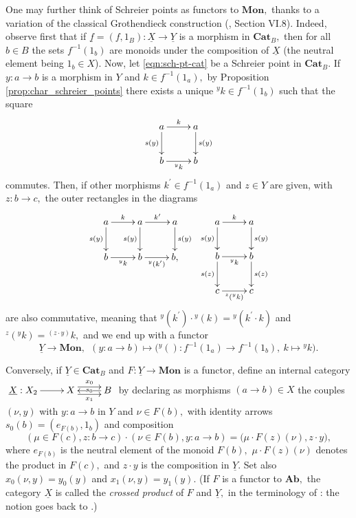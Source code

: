 \documentclass[11pt]{amsart}
\theoremstyle{plain}
\theoremstyle{definition}
\theoremstyle{remark}
\newcommand{\un}{\underline}
\begin{document}
One may further think of Schreier points as functors to $\mathbf{Mon},$ thanks to a variation of the classical Grothendieck construction (\cite{sga1}, Section VI.8). Indeed, observe first that if $\un{f}=(f,1_B)\colon\un{X}\rightarrow\un{Y}$ is a morphism in $\mathbf{Cat}_B,$ then for all $b\in B$ the sets $f^{-1}(1_b)$ are monoids under the composition of $\un{X}$ (the neutral element being $1_b\in X$). Now, let \eqref{eqn:sch-pt-cat} be a Schreier point in $\mathbf{Cat}_B.$ If $y\colon a\rightarrow b$ is a morphism in $Y$ and $k\in f^{-1}(1_a),$ by Proposition \ref{prop:char_schreier_points} there exists a unique $^yk\in f^{-1}(1_b)$ such that the square
\begin{equation*}
\xymatrix{
a \ar[d]_-{s(y)} \ar[r]^-k &a \ar[d]^-{s(y)} \\
b \ar[r]_-{^yk} &b
}
\end{equation*}
commutes. Then, if other morphisms $k^\prime\in f^{-1}(1_a)$ and $z\in Y$ are given, with $z\colon b\rightarrow c,$ the outer rectangles in the diagrams
\begin{equation*}
\begin{aligned}
\xymatrix{
a \ar[d]_-{s(y)} \ar[r]^-k &a \ar[d]_-{s(y)} \ar[r]^-{k^\prime} &a \ar[d]^-{s(y)} \\
b \ar[r]_-{^yk} &b \ar[r]_-{^y(k^\prime)} &{b,}
}
\
\xymatrix{
a \ar[d]_-{s(y)} \ar[r]^-k &a \ar[d]^-{s(y)} \\
b \ar[r]_-{^yk}  \ar[d]_-{s(z)} &b \ar[d]^-{s(z)} \\
c \ar[r]_-{^z(^yk)} &c
}
\end{aligned}
\end{equation*}
are also commutative, meaning that ${^y(k^\prime)}\cdot{}^y(k)={^y(k^\prime\cdot k)}$ and $^z(^yk)={^{(z\cdot y)}k},$ and we end up with a functor
\begin{equation}
\label{eqn:functor_sch_point}
\underline{Y} \rightarrow \mathbf{Mon}, \ \  (y\colon a\rightarrow b) \mapsto \big({^y()}\colon f^{-1}(1_a)\rightarrow f^{-1}(1_b), \ k\mapsto {^yk}\big).
\end{equation}

Conversely, if $\underline{Y}\in\mathbf{Cat}_B$ and $F\colon\underline{Y}\longrightarrow \mathbf{Mon}$ is a functor, define an internal category $\xymatrix{{\underline{X}:X_2} \ar[r] &{X} \ar@<.9ex>[r]^-{x_0} \ar@<-.9ex>[r]_-{x_1} &{B} \ar[l]|-{s_0}}$ by declaring as morphisms $(a\rightarrow b)\in X$ the couples $(\nu, y)$ with $y\colon a\rightarrow b$ in $Y$ and $\nu\in F(b),$ with identity arrows $s_0(b)=(e_{F(b)},1_b)$ and composition
\[
(\mu\in F(c),z\colon b\rightarrow c)\cdot(\nu\in F(b),y\colon a\rightarrow b)=\big(\mu\cdot F(z)(\nu),z\cdot y\big),
\]
where $e_{F(b)}$ is the neutral element of the monoid $F(b),$ $\mu\cdot F(z)(\nu)$ denotes the product in $F(c),$ and $z\cdot y$ is the composition in $\underline{Y}.$ Set also $x_0(\nu,y)=y_0(y)$ and $x_1(\nu,y)=y_1(y).$ (If $F$ is a functor to $\mathbf{Ab},$ the category $\un{X}$ is called the \emph{crossed product} of $F$ and $\un{Y},$ in the terminology of \cite{cocat}: the notion goes back to \cite{ehresmann}.)
\end{document}

